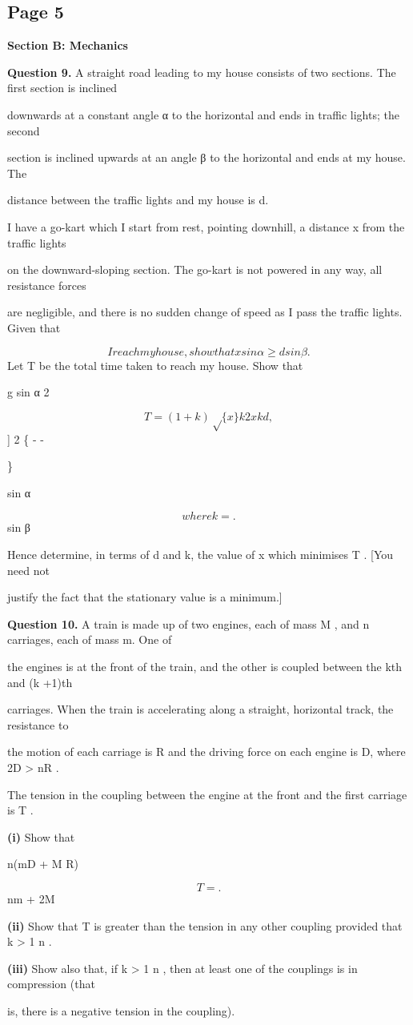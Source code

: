 \documentclass[12pt]{article}
\begin{document}
\subsection*{Page 5}
\begin{flushleft}
\bigskip\textbf{Section B: Mechanics}\par
\bigskip\textbf{Question 9.} A straight road leading to my house consists of two sections. The first section is inclined\par
downwards at a constant angle α to the horizontal and ends in traffic lights; the second\par
section is inclined upwards at an angle β to the horizontal and ends at my house. The\par
distance between the traffic lights and my house is d.\par
I have a go-kart which I start from rest, pointing downhill, a distance x from the traffic lights\par
on the downward-sloping section. The go-kart is not powered in any way, all resistance forces\par
are negligible, and there is no sudden change of speed as I pass the traffic lights. Given that\par
\[I reach my house, show that x sin α \geq d sin β .\]
Let T be the total time taken to reach my house. Show that\par
g sin α 2\par
\[T = (1 + k)\sqrt\{x\} k2x kd ,\]
] 2 \{ - -\par
\}\par
sin α\par
\[where k = .\]
sin β\par
Hence determine, in terms of d and k, the value of x which minimises T . [You need not\par
justify the fact that the stationary value is a minimum.]\par
\bigskip\textbf{Question 10.} A train is made up of two engines, each of mass M , and n carriages, each of mass m. One of\par
the engines is at the front of the train, and the other is coupled between the kth and (k +1)th\par
carriages. When the train is accelerating along a straight, horizontal track, the resistance to\par
the motion of each carriage is R and the driving force on each engine is D, where 2D > nR .\par
The tension in the coupling between the engine at the front and the first carriage is T .\par
\textbf{(i)} Show that\par
n(mD + M R)\par
\[T = .\]
nm + 2M\par
\textbf{(ii)} Show that T is greater than the tension in any other coupling provided that k > 1 n .\par
\textbf{(iii)} Show also that, if k > 1 n , then at least one of the couplings is in compression (that\par
is, there is a negative tension in the coupling).\par
\end{flushleft}
\end{document}
